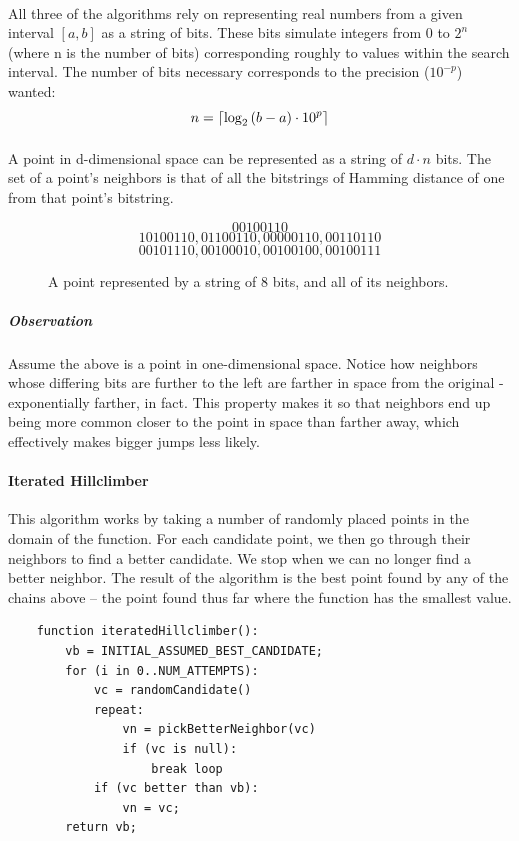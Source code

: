 \documentclass{article}
\DeclarePairedDelimiter\ceil{\lceil}{\rceil}
\begin{document}
    \paragraph{}
    All three of the algorithms rely on representing real numbers from a given interval \([a, b]\) as a string of bits. These bits simulate integers from 0 to \(2^n\) (where n is the number of bits) corresponding roughly to values within the search interval. The number of bits necessary corresponds to the precision (\(10^{-p}\)) wanted:
    $$n = \ceil{\log_2{(b - a) \cdot 10^p}}$$

    \paragraph{}
    A point in d-dimensional space can be represented as a string of \(d \cdot n\) bits. The set of a point's neighbors is that of all the bitstrings of Hamming distance of one from that point's bitstring.
    
    \begin{figure}[!h]
        \centering
        $$00100110$$
        $$10100110, 01100110, 00000110, 00110110$$
        $$00101110, 00100010, 00100100, 00100111$$
        \caption{A point represented by a string of 8 bits, and all of its neighbors.}
    \end{figure}

    \subparagraph{Observation} 
    Assume the above is a point in one-dimensional space. Notice how neighbors whose differing bits are further to the left are farther in space from the original - exponentially farther, in fact. This property makes it so that neighbors end up being more common closer to the point in space than farther away, which effectively makes bigger jumps less likely.

    \paragraph{Iterated Hillclimber}
    This algorithm works by taking a number of randomly placed points in the domain of the function. For each candidate point, we then go through their neighbors to find a better candidate. We stop when we can no longer find a better neighbor. The result of the algorithm is the best point found by any of the chains above -- the point found thus far where the function has the smallest value.
    
    \begin{verbatim}
    function iteratedHillclimber():
        vb = INITIAL_ASSUMED_BEST_CANDIDATE;
        for (i in 0..NUM_ATTEMPTS):
            vc = randomCandidate()
            repeat:
                vn = pickBetterNeighbor(vc)
                if (vc is null):
                    break loop
            if (vc better than vb):
                vn = vc;
        return vb;
    \end{verbatim}
\end{document}
